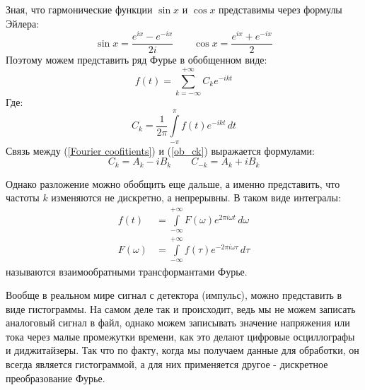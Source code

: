    Зная, что гармонические функции $\sin{x}$ и $\cos{x}$ представимы через формулы Эйлера:
\begin{equation}
    \sin{x} = \frac{e^{ix} - e^{-ix}}{2i}\qquad   \cos{x} = \frac{e^{ix} + e^{-ix}}{2}
\end{equation}
Поэтому можем представить ряд Фурье в обобщенном виде:
\begin{equation}
    f(t) = \sum \limits^{+\infty}_{k = -\infty} C_k e^{-ikt}
\end{equation}
Где:
\begin{equation}
    C_k = \frac1{2\pi}\int \limits_{-\pi}^{\pi}f(t)e^{-ikt}\,dt
    \label{ob_ck}
\end{equation}
Связь между (\ref{Fourier coofitients}) и (\ref{ob_ck}) выражается формулами:
\begin{equation*}
    C_k=A_k - iB_k \qquad C_{-k}= A_k + iB_k
\end{equation*}

Однако разложение можно обобщить еще дальше, а именно представить, что частоты $k$ изменяются не дискретно, а непрерывны. В таком виде интегралы:
\begin{align}
    f(t) & {} = \int \limits^{+\infty}_{-\infty}F(\omega)e^{2\pi i \omega t}\, d\omega\\
    F(\omega) & {}= \int \limits^{+\infty}_{-\infty}f(\tau)e^{-2\pi i \omega \tau}\, d\tau
    \label{fourier_transform}
\end{align}
называются взаимообратными трансформантами Фурье.

Вообще в реальном мире сигнал с детектора (импульс), можно представить в виде гистограммы. На самом деле так и происходит, ведь мы не можем записать аналоговый сигнал в файл, однако можем записывать значение напряжения или тока через малые промежутки времени, как это делают цифровые осциллографы и диджитайзеры. Так что по факту, когда мы получаем данные для обработки, он всегда является гистограммой, а для них применяется другое - дискретное преобразование Фурье.

